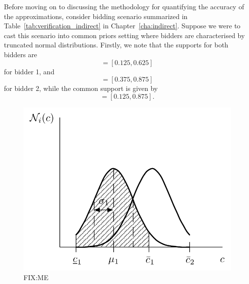 Before moving on to discussing the methodology for quantifying the accuracy of the approximations, consider bidding scenario summarized in Table~\ref{tab:verification_indirect} in Chapter~\ref{cha:indirect}. Suppose we were to cast this scenario into common priors setting where bidders are characterised by truncated normal distributions. Firstly, we note that the supports for both bidders are
\begin{equation*}
  [\underline{c}_1, \bar{c}_1] = [0.125, 0.625]
\end{equation*}
for bidder 1, and
\begin{equation*}
  [\underline{c}_2, \bar{c}_2] = [0.375, 0.875]
\end{equation*}
for bidder 2, while the common support is given by
\begin{equation*}
  [\underline{c}_1, \bar{c}_2] = [0.125, 0.875].
\end{equation*}

\begin{figure}[t]
  \includegraphics[width=\figsize]{Approximation/Figures/modelling_params}
  \caption{FIX:ME}
  \label{fig:modelling_params_approximation}
\end{figure}


